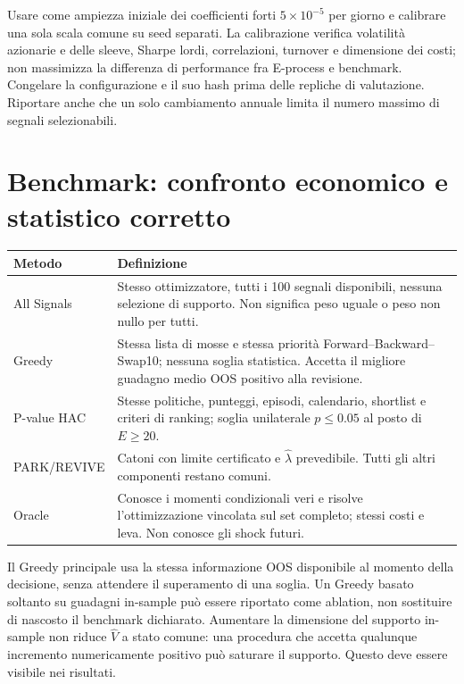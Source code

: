 \documentclass[11pt,a4paper]{article}
\theoremstyle{definition}\newtheorem{definition}[theorem]{Definizione}
\theoremstyle{remark}\newtheorem{remark}[theorem]{Osservazione}
\begin{document}
Usare come ampiezza iniziale dei coefficienti forti $5\times10^{-5}$ per giorno e calibrare una sola scala comune su seed separati. La calibrazione verifica volatilità azionarie e delle sleeve, Sharpe lordi, correlazioni, turnover e dimensione dei costi; non massimizza la differenza di performance fra E-process e benchmark. Congelare la configurazione e il suo hash prima delle repliche di valutazione. Riportare anche che un solo cambiamento annuale limita il numero massimo di segnali selezionabili.

\section{Benchmark: confronto economico e statistico corretto}
\label{sec:benchmarks}
\begin{longtable}{p{.20\linewidth}p{.74\linewidth}}
\toprule Metodo & Definizione\\\midrule\endhead
All Signals & Stesso ottimizzatore, tutti i 100 segnali disponibili, nessuna selezione di supporto. Non significa peso uguale o peso non nullo per tutti.\\
Greedy & Stessa lista di mosse e stessa priorità Forward--Backward--Swap10; nessuna soglia statistica. Accetta il migliore guadagno medio OOS positivo alla revisione.\\
P-value HAC & Stesse politiche, punteggi, episodi, calendario, shortlist e criteri di ranking; soglia unilaterale $p\le0.05$ al posto di $E\ge20$.\\
PARK/REVIVE & Catoni con limite certificato e $\widehat\lambda$ prevedibile. Tutti gli altri componenti restano comuni.\\
Oracle & Conosce i momenti condizionali veri e risolve l'ottimizzazione vincolata sul set completo; stessi costi e leva. Non conosce gli shock futuri.\\\bottomrule
\end{longtable}

Il Greedy principale usa la stessa informazione OOS disponibile al momento della decisione, senza attendere il superamento di una soglia. Un Greedy basato soltanto su guadagni in-sample può essere riportato come ablation, non sostituire di nascosto il benchmark dichiarato. Aumentare la dimensione del supporto in-sample non riduce $\widehat V$ a stato comune: una procedura che accetta qualunque incremento numericamente positivo può saturare il supporto. Questo deve essere visibile nei risultati.
\end{document}
